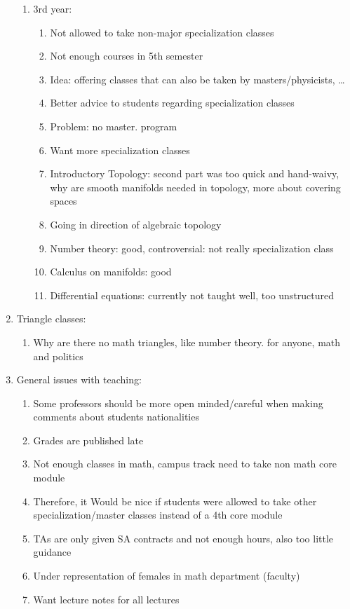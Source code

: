 \begin{enumerate}
\begin{enumerate}
\item 3rd year:
\begin{enumerate}
\item Not allowed to take non-major specialization classes
\item Not enough courses in 5th semester
\item Idea: offering classes that can also be taken by masters/physicists, \ldots
\item Better advice to students regarding specialization classes
\item Problem: no master. program
\item Want more specialization classes
\item Introductory Topology: second part was too quick and hand-waivy, why are smooth manifolds needed in topology, more about covering spaces
\item Going in direction of algebraic topology
\item Number theory: good, controversial: not really specialization class
\item Calculus on manifolds: good
\item Differential equations: currently not taught well, too unstructured
\end{enumerate}
\end{enumerate}
\item Triangle classes:
\begin{enumerate}
\item Why are there no math triangles, like number theory. for anyone, math and politics
\end{enumerate}
\item General issues with teaching:
\begin{enumerate}
\item Some professors should be more open minded/careful when making comments about students nationalities
\item Grades are published late
\item Not enough classes in math, campus track need to take non math core module
\item Therefore, it Would be nice if students were allowed to take other specialization/master classes instead of a 4th core module
\item TAs are only given SA contracts and not enough hours, also too little guidance
\item Under representation of females in math department (faculty)
\item Want lecture notes for all lectures

\end{enumerate}
\end{enumerate}
